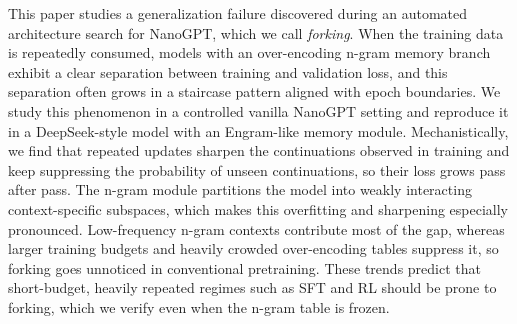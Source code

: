 This paper studies a generalization failure discovered during an automated architecture search for NanoGPT, which we call \emph{forking}. When the training data is repeatedly consumed, models with an over-encoding n-gram memory branch exhibit a clear separation between training and validation loss, and this separation often grows in a staircase pattern aligned with epoch boundaries. We study this phenomenon in a controlled vanilla NanoGPT setting and reproduce it in a DeepSeek-style model with an Engram-like memory module. Mechanistically, we find that repeated updates sharpen the continuations observed in training and keep suppressing the probability of unseen continuations, so their loss grows pass after pass. The n-gram module partitions the model into weakly interacting context-specific subspaces, which makes this overfitting and sharpening especially pronounced. Low-frequency n-gram contexts contribute most of the gap, whereas larger training budgets and heavily crowded over-encoding tables suppress it, so forking goes unnoticed in conventional pretraining. These trends predict that short-budget, heavily repeated regimes such as SFT and RL should be prone to forking, which we verify even when the n-gram table is frozen.
